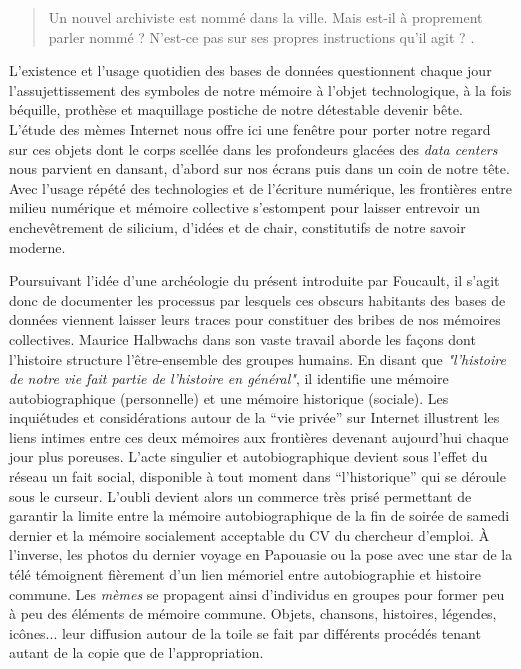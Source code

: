 \begin{quote}
Un nouvel archiviste est nomm\'e dans la ville. Mais est-il \`a proprement parler nomm\'e ?
N'est-ce pas sur ses propres instructions qu'il agit ? 
\citep{Deleuze1972a}.
\end{quote}

L{\textquoteright}existence et l{\textquoteright}usage quotidien des bases de donn\'ees questionnent chaque jour l{\textquoteright}assujettissement des symboles de notre m\'emoire \`a l{\textquoteright}objet technologique, \`a la fois b\'equille, proth\`ese et maquillage postiche de notre d\'etestable devenir b\^ete. L{\textquoteright}\'etude des m\`emes Internet nous offre ici une fen\^etre pour porter notre regard sur ces objets dont le corps scell\'ee dans les profondeurs glac\'ees des \textit{data centers }nous parvient en dansant, d{\textquoteright}abord sur nos \'ecrans puis dans un coin de notre t\^ete. Avec l{\textquoteright}usage r\'ep\'et\'e des technologies et de l{\textquoteright}\'ecriture num\'erique, les fronti\`eres entre milieu num\'erique et m\'emoire collective s{\textquoteright}estompent pour laisser entrevoir un enchev\^etrement de silicium, d{\textquoteright}id\'ees et de chair, constitutifs de notre savoir moderne. 

Poursuivant l{\textquoteright}id\'ee d{\textquoteright}une arch\'eologie du pr\'esent introduite par Foucault, il s{\textquoteright}agit donc de documenter les processus par lesquels ces obscurs habitants des bases de donn\'ees viennent laisser leurs traces pour constituer des bribes de nos m\'emoires collectives. Maurice Halbwachs dans son vaste travail aborde les fa\c{c}ons dont l{\textquoteright}histoire structure l{\textquoteright}\^etre-ensemble des groupes humains. En disant que \textit{"l'histoire de notre vie fait partie de l'histoire en général"}\citep{Halbwachs1947}, il identifie une m\'emoire autobiographique (personnelle) et une m\'emoire historique (sociale). Les inqui\'etudes et consid\'erations autour de la {\textquotedblleft}vie priv\'ee{\textquotedblright} sur Internet illustrent les liens intimes entre ces deux m\'emoires aux fronti\`eres devenant aujourd{\textquoteright}hui chaque jour plus poreuses. L{\textquoteright}acte singulier et autobiographique devient sous l{\textquoteright}effet du r\'eseau un fait social, disponible \`a tout moment dans {\textquotedblleft}l{\textquoteright}historique{\textquotedblright} qui se d\'eroule sous le curseur. L{\textquoteright}oubli devient alors un commerce tr\`es pris\'e permettant de garantir la limite entre la m\'emoire autobiographique de la fin de soir\'ee de samedi dernier et la m\'emoire socialement acceptable du CV du chercheur d{\textquoteright}emploi. \`A l{\textquoteright}inverse, les photos du dernier voyage en Papouasie ou la pose avec une star de la t\'el\'e t\'emoignent fi\`erement d{\textquoteright}un lien m\'emoriel entre autobiographie et histoire commune. Les \textit{m\`emes} se propagent ainsi d{\textquoteright}individus en groupes pour former peu \`a peu des \'el\'ements de m\'emoire commune. Objets, chansons, histoires, l\'egendes, ic\^ones... leur diffusion autour de la toile se fait par diff\'erents proc\'ed\'es tenant autant de la copie que de l{\textquoteright}appropriation. 

